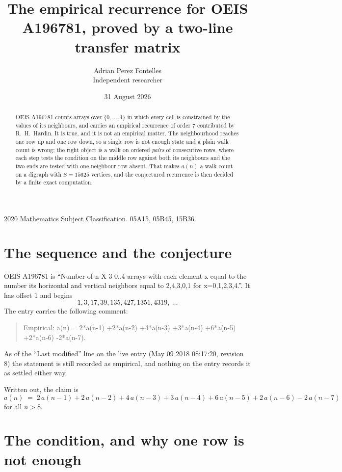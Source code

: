 \documentclass[11pt,a4paper]{article}
\title{The empirical recurrence for OEIS A196781, proved by a two-line transfer matrix}
\author{Adrian Perez Fontelles\\ \small Independent researcher}
\date{31 August 2026}
\theoremstyle{plain}
\theoremstyle{definition}
\begin{document}
\maketitle

\begin{abstract}
OEIS A196781 counts arrays over $\{0,\dots,4\}$ in which every cell is constrained by the
values of its neighbours, and carries an empirical recurrence of order $7$ contributed
by R.~H.~Hardin. It is true, and it is not an empirical matter. The neighbourhood reaches one
row up and one row down, so a single row is not enough state and a plain walk count
is wrong; the right object is a walk on ordered \emph{pairs} of consecutive rows, where
each step tests the condition on the middle row against both its neighbours and the two
ends are tested with one neighbour row absent. That makes $a(n)$ a walk count on a digraph
with $S=15625$ vertices, and the conjectured recurrence is then decided by a finite exact
computation.
\end{abstract}

\noindent\small 2020 Mathematics Subject Classification. 05A15, 05B45, 15B36.\normalsize

\section{The sequence and the conjecture}

OEIS A196781 is ``Number of n X 3 0..4 arrays with each element x equal to the number its horizontal and vertical neighbors equal to 2,4,3,0,1 for x=0,1,2,3,4.''. It has offset $1$ and begins
\[
1, 3, 17, 39, 135, 427, 1351, 4319,\ \dots
\]
The entry carries the following comment:
\begin{quote}\small
Empirical: a(n) = 2*a(n-1) +2*a(n-2) +4*a(n-3) +3*a(n-4) +6*a(n-5) +2*a(n-6) -2*a(n-7).
\end{quote}
As of the ``Last modified'' line on the live entry (May 09 2018 08:17:20, revision 8) the statement is
still recorded as empirical, and nothing on the entry records it as settled either way.

Written out, the claim is
\begin{equation}\label{eq:conj}
a(n)\;=\;2\,a(n-1) + 2\,a(n-2) + 4\,a(n-3) + 3\,a(n-4) + 6\,a(n-5) + 2\,a(n-6) - 2\,a(n-7)
\end{equation}
for all $n>8$.

\section{The condition, and why one row is not enough}
\end{document}
